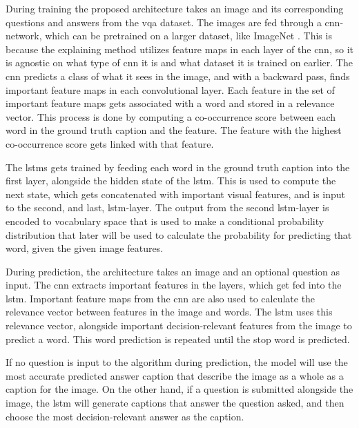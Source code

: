 During training the proposed architecture takes an image and its corresponding questions and answers from the \gls{vqa} dataset. The images are fed through a \gls{cnn}-network, which can be pretrained on a larger dataset, like ImageNet \cite{dengImageNetLargeScaleHierarchical2009}. This is because the explaining method utilizes feature maps in each layer of the \gls{cnn}, so it is agnostic on what type of \gls{cnn} it is and what dataset it is trained on earlier. The \gls{cnn} predicts a class of what it sees in the image, and with a backward pass, finds important feature maps in each  convolutional layer. Each feature in the set of important feature maps gets associated with a word and stored in a relevance vector. This process is done by computing a co-occurrence score between each word in the ground truth caption and the feature. The feature with the highest co-occurrence score gets linked with that feature. 

The \glspl{lstm} gets trained by feeding each word in the ground truth caption into the first layer, alongside the hidden state of the \gls{lstm}. This is used to compute the next state, which gets concatenated with important visual features, and is input to the second, and last, \gls{lstm}-layer. 
The output from the second \gls{lstm}-layer is encoded to vocabulary space that is used to make a conditional probability distribution that later will be used to calculate the probability for predicting that word, given the given image features. 

During prediction, the architecture takes an image and an optional question as input. The \gls{cnn} extracts important features in the layers, which get fed into the \gls{lstm}. Important feature maps from the \gls{cnn} are also used to calculate the relevance vector between features in the image and words. The \gls{lstm} uses this relevance vector, alongside important decision-relevant features from the image to predict a word. This word prediction is repeated until the stop word is predicted. 

If no question is input to the algorithm during prediction, the model will use the most accurate predicted answer caption that describe the image as a whole as a caption for the image. On the other hand, if a question is submitted alongside the image, the \gls{lstm} will generate captions that answer the question asked, and then choose the most decision-relevant answer as the caption. 



